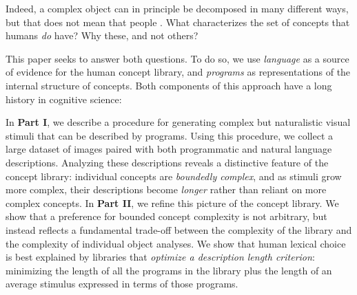 \documentclass[10pt,letterpaper]{article}
\newcommand{\jda}[1]{{\color{blue}[jda: #1]}}
\begin{document}
Indeed, a complex object can in principle be decomposed in many different ways, but that does not mean that people . What characterizes the set of concepts that humans \emph{do} have? Why these, and not others?













This paper seeks to answer both questions. 
To do so, we use \emph{language} as a source of evidence for the human concept library, and \emph{programs} as representations of the internal structure of concepts. Both components of this approach have a long history in cognitive science: 


In \textbf{Part I}, we describe a procedure for generating complex but naturalistic visual stimuli that can be described by programs. Using this procedure, we collect a large dataset of images paired with both programmatic and natural language descriptions. Analyzing these descriptions reveals a distinctive feature of the concept library: individual concepts are \emph{boundedly complex}, and as stimuli grow more complex, their descriptions become \emph{longer} rather than reliant on more complex concepts.
In \textbf{Part II}, we refine this picture of the concept library. We show that a preference for bounded concept complexity is not arbitrary, but instead reflects a fundamental trade-off between the complexity of the library and the complexity of individual object analyses. We show that human lexical choice is best explained by libraries that \emph{optimize a description length criterion}: minimizing the length of all the programs in the library plus the length of an average stimulus expressed in terms of those programs.
\end{document}
